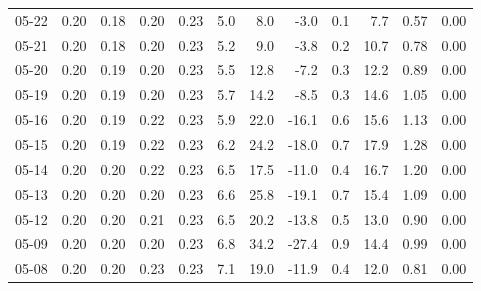 \begin{threeparttable}
{\begin{tabular}{lrrrrrrrrrrr}
  05-22 &          0.20 &          0.18 &          0.20 &        0.23 &                 5.0 &                 8.0 &       -3.0 &                 0.1 &              7.7 &            0.57 &                   0.00 \\
  05-21 &          0.20 &          0.18 &          0.20 &        0.23 &                 5.2 &                 9.0 &       -3.8 &                 0.2 &             10.7 &            0.78 &                   0.00 \\
  05-20 &          0.20 &          0.19 &          0.20 &        0.23 &                 5.5 &                12.8 &       -7.2 &                 0.3 &             12.2 &            0.89 &                   0.00 \\
  05-19 &          0.20 &          0.19 &          0.20 &        0.23 &                 5.7 &                14.2 &       -8.5 &                 0.3 &             14.6 &            1.05 &                   0.00 \\
  05-16 &          0.20 &          0.19 &          0.22 &        0.23 &                 5.9 &                22.0 &      -16.1 &                 0.6 &             15.6 &            1.13 &                   0.00 \\
  05-15 &          0.20 &          0.19 &          0.22 &        0.23 &                 6.2 &                24.2 &      -18.0 &                 0.7 &             17.9 &            1.28 &                   0.00 \\
  05-14 &          0.20 &          0.20 &          0.22 &        0.23 &                 6.5 &                17.5 &      -11.0 &                 0.4 &             16.7 &            1.20 &                   0.00 \\
  05-13 &          0.20 &          0.20 &          0.20 &        0.23 &                 6.6 &                25.8 &      -19.1 &                 0.7 &             15.4 &            1.09 &                   0.00 \\
  05-12 &          0.20 &          0.20 &          0.21 &        0.23 &                 6.5 &                20.2 &      -13.8 &                 0.5 &             13.0 &            0.90 &                   0.00 \\
  05-09 &          0.20 &          0.20 &          0.20 &        0.23 &                 6.8 &                34.2 &      -27.4 &                 0.9 &             14.4 &            0.99 &                   0.00 \\
  05-08 &          0.20 &          0.20 &          0.23 &        0.23 &                 7.1 &                19.0 &      -11.9 &                 0.4 &             12.0 &            0.81 &                   0.00 \\

\end{tabular}}
\end{threeparttable}
